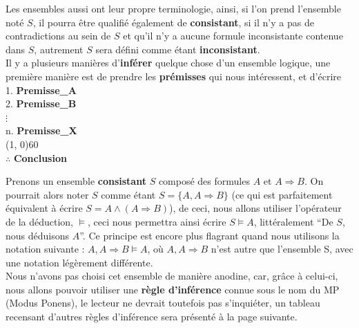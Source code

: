 \documentclass[a4paper, 12pt]{article}
\newcommand{\imply}{\Rightarrow}
\numberwithin{equation}{subsection}
\begin{document}
  Les ensembles aussi ont leur propre terminologie, ainsi, si l'on prend l'ensemble noté $S$, il pourra être qualifié également de {\bf consistant}, si il n'y a pas de contradictions au sein de $S$ et qu'il n'y a aucune formule inconsistante contenue dans $S$, autrement $S$ sera défini comme étant {\bf inconsistant}. \\[0.5cm]
  Il y a plusieurs manières d'{\bf inférer} quelque chose d'un ensemble logique, une première manière est de prendre les {\bf prémisses} qui nous intéressent, et d'écrire \\[0.5cm]
    1. {\bf Premisse\_A} \\
    2. {\bf Premisse\_B} \\
    \hspace{0.2cm}$\vdots$ \\
    n. {\bf Premisse\_X} \\
    \hspace{0.5cm}\line(1, 0){60} \\
    $\therefore$ {\bf Conclusion} \

    Prenons un ensemble {\bf consistant} $S$ composé des formules $A$ et $A \imply B$. On pourrait alors noter $S$ comme étant $S = \{ A, A \imply B \}$ (ce qui est parfaitement équivalent à écrire $S = A \land (A \imply B)$), de ceci, nous allons utiliser l'opérateur de la déduction, $\vDash$, ceci nous permettra ainsi écrire $S \vDash A$, littéralement ``De $S$, nous déduisons $A$''. Ce principe est encore plus flagrant quand nous utilisons la notation suivante : $A, A \imply B \models A$, où $A, A \imply B$ n'est autre que l'ensemble S, avec une notation légèrement différente. \\

    Nous n'avons pas choisi cet ensemble de manière anodine, car, grâce à celui-ci, nous allons pouvoir utiliser une {\bf règle d'inférence} connue sous le nom du MP (Modus Ponens), le lecteur ne devrait toutefois pas s'inquiéter, un tableau recensant d'autres règles d'inférence sera présenté à la page suivante. \\
\end{document}
